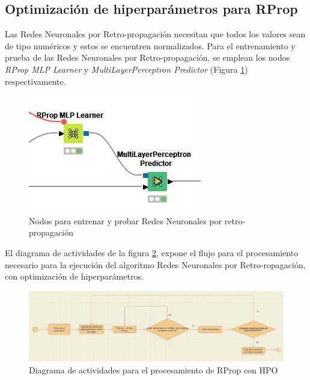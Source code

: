 \subsection{Optimización de hiperparámetros para RProp}
Las Redes Neuronales por Retro-propagación necesitan que todos los valores sean de tipo numéricos y estos se encuentren normalizados. Para el entrenamiento y prueba de las Redes Neuronales por Retro-propagación, se emplean los nodos \textit{RProp MLP Learner} y \textit{MultiLayerPerceptron Predictor} (Figura \ref{fig:nodos-rprop}) respectivamente.

\begin{figure}[H]
	\centering
	\includegraphics[width=0.4\linewidth]{"figuras/capi 2/nodos-rprop"}
	\caption[Nodos para entrenar y probar Redes Neuronales por retro propagación]{Nodos para entrenar y probar Redes Neuronales por retro-propagación}
	\label{fig:nodos-rprop}
\end{figure}

El diagrama de actividades de la figura \ref{fig:diagrama-act-proc-rprop-hpo}, expone el flujo para el procesamiento necesario para la ejecución del algoritmo Redes Neuronales por Retro-ropagación, con optimización de hiperparámetros.
\begin{figure}[H]
	\centering
	\includegraphics[width=0.7\linewidth]{"figuras/capi 2/diagrama-act-proc-rprop-hpo"}
	\caption[Diagrama de actividades para el procesamiento de RProp con HPO]{Diagrama de actividades para el procesamiento de RProp con HPO}
	\label{fig:diagrama-act-proc-rprop-hpo}
\end{figure}

